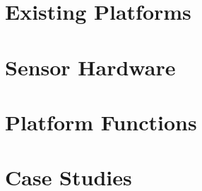   \section{Existing Platforms}
  \section{Sensor Hardware}
  \section{Platform Functions}
  \section{Case Studies}